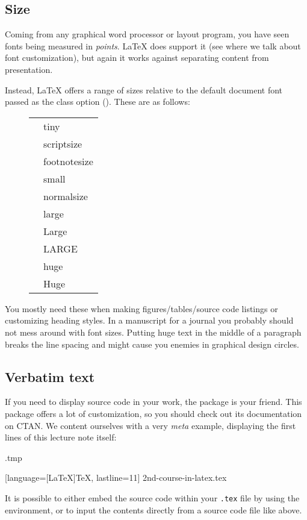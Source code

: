 %
%
\subsection{Size}

Coming from any graphical word processor or layout program,
you have seen fonts being measured in \emph{points}.
\LaTeX{} does support it (see  where we talk about font customization),
but again it works against separating content from presentation.

Instead, \LaTeX{} offers a range of sizes relative to the default document font
passed as the class option ().
These are as follows:
%
\begin{figure}[h]
\centering
\newcommand{\example}[1]{\cmd{#1}\texttt &%
    \csname#1\endcsname{Example text}}
\begin{tabular}{l|l}
\example{tiny}\\
\example{scriptsize}\\
\example{footnotesize}\\
\example{small}\\
\example{normalsize}\\
\example{large}\\
\example{Large}\\
\example{LARGE}\\
\example{huge}\\
\example{Huge}
\end{tabular}
\end{figure}

You mostly need these when making figures/tables/source code listings
or customizing heading styles.
In a manuscript for a journal you probably should not mess around with font sizes.
Putting {\huge huge text} in the middle of a paragraph
breaks the line spacing and might cause you enemies in graphical design circles.


%
%
\subsection{Verbatim text}


If you need to display source code in your work,
the  package is your friend.
This package offers a lot of customization,
so you should check out its documentation on CTAN.
We content ourselves with a very \emph{meta} example,
displaying the first lines of this lecture note itself:
%
\begin{VerbatimOut}{\jobname.tmp}


  [language={[LaTeX]TeX}, lastline=11]
  {2nd-course-in-latex.tex}
\end{VerbatimOut}
\ShowExample
%
It is possible to either embed the source code within your \verb|.tex| file
by using the  environment,
or to input the contents directly from a source code file like above.

